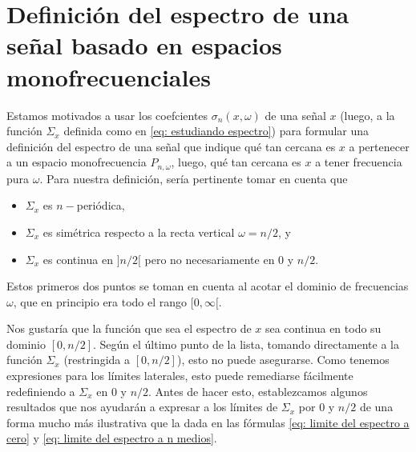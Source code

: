 \section{Definición del espectro de una señal basado en espacios monofrecuenciales}

Estamos motivados a usar los coefcientes
$\sigma_{n}(x, \omega)$ de una señal $x$
(luego, a la función $\Sigma_{x}$ definida como en 
\eqref{eq: estudiando espectro}) para formular una definición
del espectro de una señal que indique qué tan cercana
es $x$ a pertenecer a un espacio monofrecuencia
$P_{n, \omega}$, luego, qué tan cercana es $x$ a tener
frecuencia pura $\omega$. Para nuestra definición, sería pertinente tomar
en cuenta que 

\begin{itemize}
\item $\Sigma_{x}$ es $n-$periódica, 
\item $\Sigma_{x}$ es simétrica respecto a la recta
vertical $\omega = n/2$, y
\item $\Sigma_{x}$ es continua en $]n/2[$ pero no necesariamente
en $0$ y $n/2$.
\end{itemize}
Estos primeros dos puntos se toman en cuenta al acotar
el dominio de frecuencias $\omega$, que en principio
era todo el rango $[0, \infty[$.

Nos gustaría que la función que sea el espectro de $x$
sea continua en todo su dominio
$[0, n/2]$. Según el último punto de la lista, tomando
directamente a la función $\Sigma_{x}$ (restringida a 
$[0,n/2]$), esto no puede asegurarse.
Como tenemos expresiones para los límites laterales, esto puede
remediarse fácilmente redefiniendo a 
$\Sigma_{x}$ en $0$ y $n/2$. Antes de hacer esto, 
establezcamos algunos resultados que nos ayudarán a expresar
a los límites de $\Sigma_{x}$ por $0$ y $n/2$
de una forma mucho más ilustrativa que la dada
en las fórmulas 
\eqref{eq: limite del espectro a cero}
y
\eqref{eq: limite del espectro a n medios}.

